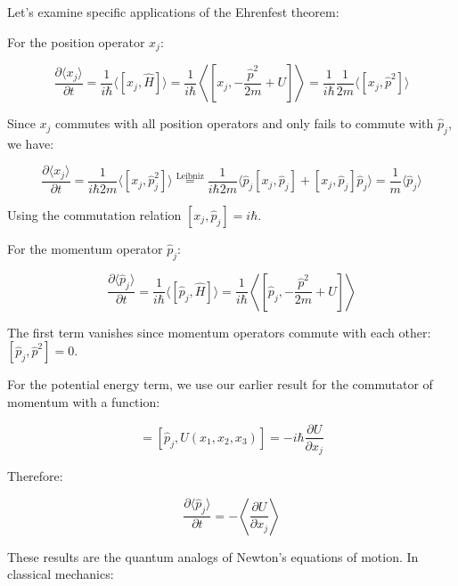 \documentclass[italian]{HKNdocument}
\begin{document}
Let's examine specific applications of the Ehrenfest theorem:

For the position operator $x_j$:

\begin{equation}
\frac{\partial\langle x_j\rangle}{\partial t} = \frac{1}{i\hbar}\langle[x_j,\hat{H}]\rangle = \frac{1}{i\hbar}\left\langle\left[x_j,-\frac{\hat{p}^2}{2m}+U\right]\right\rangle = \frac{1}{i\hbar}\frac{1}{2m}\langle[x_j,\hat{p}^2]\rangle
\end{equation}

Since $x_j$ commutes with all position operators and only fails to commute with $\hat{p}_j$, we have:

\begin{equation}
\frac{\partial\langle x_j\rangle}{\partial t} = \frac{1}{i\hbar 2m}\langle[x_j,\hat{p}_j^2]\rangle \stackrel{\text{Leibniz}}{=} \frac{1}{i\hbar 2m}\langle\hat{p}_j[x_j,\hat{p}_j]+[x_j,\hat{p}_j]\hat{p}_j\rangle = \frac{1}{m}\langle\hat{p}_j\rangle
\end{equation}

Using the commutation relation $[x_j,\hat{p}_j] = i\hbar$.

For the momentum operator $\hat{p}_j$:

\begin{equation}
\frac{\partial\langle\hat{p}_j\rangle}{\partial t} = \frac{1}{i\hbar}\langle[\hat{p}_j,\hat{H}]\rangle = \frac{1}{i\hbar}\left\langle\left[\hat{p}_j,-\frac{\hat{p}^2}{2m}+U\right]\right\rangle
\end{equation}

The first term vanishes since momentum operators commute with each other: $[\hat{p}_j,\hat{p}^2] = 0$.

For the potential energy term, we use our earlier result for the commutator of momentum with a function:

\begin{equation}
[\hat{p}_j,U] = [\hat{p}_j,U(x_1,x_2,x_3)] = -i\hbar\frac{\partial U}{\partial x_j}
\end{equation}

Therefore:

\begin{equation}
\frac{\partial\langle\hat{p}_j\rangle}{\partial t} = -\left\langle\frac{\partial U}{\partial x_j}\right\rangle
\end{equation}

These results are the quantum analogs of Newton's equations of motion. In classical mechanics:
\end{document}
